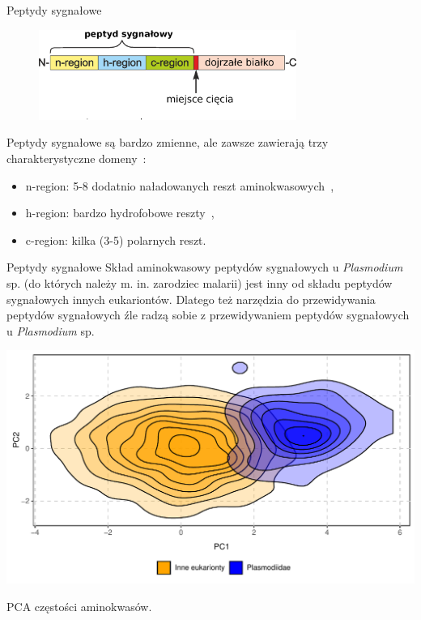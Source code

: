 \documentclass{beamer}\usepackage[]{graphicx}\usepackage[]{color}
\makeatletter
\def\maxwidth{ %
  \ifdim\Gin@nat@width>\linewidth
    \linewidth
  \else
    \Gin@nat@width
  \fi
}
\makeatother
\begin{document}
  
\begin{frame}{Peptydy sygnałowe}

\begin{figure} 
\includegraphics[width=0.75\textwidth]{static_figure/SP.eps}
\end{figure}

Peptydy sygnałowe są bardzo zmienne, ale zawsze zawierają trzy charakterystyczne domeny~\citep{hegde_surprising_2006}:
\begin{itemize}
        \item n-region: 5-8 dodatnio naładowanych reszt aminokwasowych~\citep{nielsen_prediction_1998},
        \item h-region: bardzo hydrofobowe reszty~\citep{nielsen_prediction_1998},
        \item c-region: kilka (3-5) polarnych reszt.
\end{itemize}

\end{frame}



  
\begin{frame}{Peptydy sygnałowe}  
Skład aminokwasowy peptydów sygnałowych u \textit{Plasmodium} sp. (do których należy m. in. zarodziec malarii) jest inny od składu peptydów sygnałowych innych eukariontów. Dlatego też narzędzia do przewidywania peptydów sygnałowych źle radzą sobie z przewidywaniem peptydów sygnałowych u \textit{Plasmodium} sp.


\includegraphics[width=\maxwidth]{figure/unnamed-chunk-5-1} 


PCA częstości aminokwasów.
\end{frame}  
\end{document}
